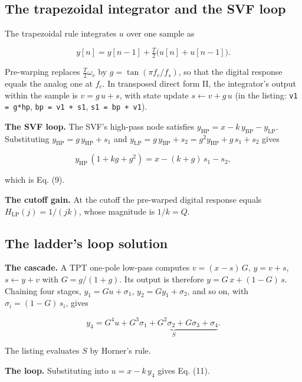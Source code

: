 \documentclass[conference]{IEEEtran}
\begin{document}
\setcounter{subsection}{1}
\subsection{The trapezoidal integrator and the SVF loop}
The trapezoidal rule integrates $u$ over one sample as

\begin{equation*}
y[n] = y[n-1] + \tfrac{T}{2}\big(u[n] + u[n-1]\big).
\end{equation*}

Pre-warping replaces $\tfrac{T}{2}\omega_c$ by $g = \tan(\pi f_c / f_s)$, so that the digital response equals the analog one at $f_c$. In transposed direct form II, the integrator's output within the sample is $v = g\,u + s$, with state update $s \leftarrow v + g\,u$ (in the listing: \texttt{v1 = g*hp}, \texttt{bp = v1 + s1}, \texttt{s1 = bp + v1}).

\textbf{The SVF loop.} The SVF's high-pass node satisfies $y_{\mathrm{HP}} = x - k\,y_{\mathrm{BP}} - y_{\mathrm{LP}}$. Substituting $y_{\mathrm{BP}} = g\,y_{\mathrm{HP}} + s_1$ and $y_{\mathrm{LP}} = g\,y_{\mathrm{BP}} + s_2 = g^2 y_{\mathrm{HP}} + g\,s_1 + s_2$ gives

\begin{equation*}
y_{\mathrm{HP}}\,(1 + k g + g^2) = x - (k + g)\,s_1 - s_2,
\end{equation*}

which is Eq. (9).

\textbf{The cutoff gain.} At the cutoff the pre-warped digital response equals $H_{\mathrm{LP}}(j) = 1/(jk)$, whose magnitude is $1/k = Q$.

\setcounter{subsection}{2}
\subsection{The ladder's loop solution}
\textbf{The cascade.} A TPT one-pole low-pass computes $v = (x - s)\,G$, $y = v + s$, $s \leftarrow y + v$ with $G = g/(1+g)$. Its output is therefore $y = G\,x + (1 - G)\,s$. Chaining four stages, $y_1 = G u + \sigma_1$, $y_2 = G y_1 + \sigma_2$, and so on, with $\sigma_i = (1-G)\,s_i$, gives

\begin{equation*}
y_4 = G^4 u + \underbrace{G^3\sigma_1 + G^2\sigma_2 + G\sigma_3 + \sigma_4}_{S}.
\end{equation*}

The listing evaluates $S$ by Horner's rule.

\textbf{The loop.} Substituting into $u = x - k\,y_4$ gives Eq. (11).
\end{document}
